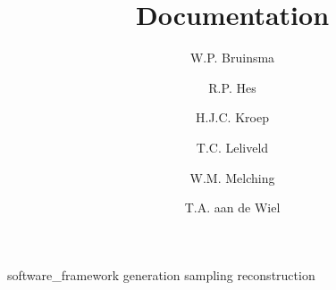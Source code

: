 \documentclass[a4paper, openany, oneside]{memoir}
\title{Documentation}
\author{W.P. Bruinsma \and R.P. Hes \and H.J.C. Kroep \and T.C. Leliveld \and W.M. Melching \and T.A. aan de Wiel}
\begin{document}
\frontmatter

\begin{titlingpage}
  \pagestyle{empty}
  \maketitle
\end{titlingpage}


\tableofcontents

\mainmatter

{software_framework}
{generation}
{sampling}
{reconstruction}


\appendix
\end{document}
